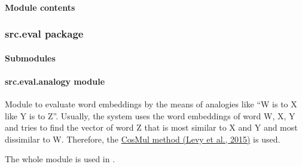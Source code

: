 \documentclass[letterpaper,10pt,english]{sphinxmanual}
\begin{document}
\paragraph{Module contents}
\label{src.clustering:module-contents}\label{src.clustering:module-src.clustering}

\subsubsection{src.eval package}
\label{src.eval::doc}\label{src.eval:src-eval-package}

\paragraph{Submodules}
\label{src.eval:submodules}

\paragraph{src.eval.analogy module}
\label{src.eval:module-src.eval.analogy}\label{src.eval:src-eval-analogy-module}
Module to evaluate word embeddings by the means of analogies like ``W is to X like Y is to Z''. Usually,
the system uses the word embeddings of word W, X, Y and tries to find the vector of word Z that is most similar to
X and Y and most dissimilar to W.
Therefore, the \href{https://transacl.org/ojs/index.php/tacl/article/viewFile/570/124}{CosMul method (Levy et al., 2015)}
is used.

The whole module is used in .
\end{document}
